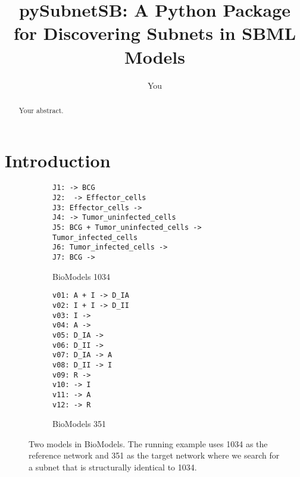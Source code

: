 \documentclass{article}
\title{pySubnetSB: A Python Package for Discovering Subnets in SBML Models}
\author{You}
\begin{document}
\maketitle

\begin{abstract}
Your abstract.
\end{abstract}

\section{Introduction}

\begin{figure}
\centering
\begin{subfigure}{0.7\textwidth}
\begin{framed}
\begin{verbatim}
J1: -> BCG
J2:  -> Effector_cells
J3: Effector_cells ->
J4: -> Tumor_uninfected_cells
J5: BCG + Tumor_uninfected_cells -> Tumor_infected_cells
J6: Tumor_infected_cells ->
J7: BCG ->
\end{verbatim}
\end{framed}
    \caption{BioModels 1034}
    \label{fig:biomodels1034}
\end{subfigure}
\begin{subfigure}{0.25\textwidth}
\begin{framed}
\begin{verbatim}
v01: A + I -> D_IA
v02: I + I -> D_II
v03: I ->
v04: A ->
v05: D_IA ->
v06: D_II ->
v07: D_IA -> A
v08: D_II -> I
v09: R ->
v10: -> I
v11: -> A
v12: -> R 
\end{verbatim}
\end{framed}
 \caption{BioModels 351}
\end{subfigure}
\caption{Two models in BioModels. The running example uses 1034 as the reference network and 351 as the target network where we search for a subnet that is structurally identical to 1034.}
\label{fig:models}
\end{figure}
\end{document}
